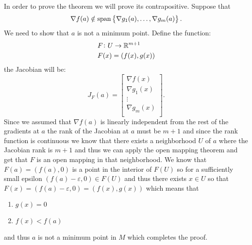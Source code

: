 \documentclass[11pt,a4paper]{article}
\begin{document}
\begin{proofof}{}
  In order to prove the theorem we will prove its contrapositive.
  Suppose that
  \[
    \nabla f(a) \notin 
    \operatorname{span}\left\{\nabla g_1(a),\dots,\nabla g_m(a)\right\}.
  \]
  We need to show that $a$ is not a minimum point.
  Define the function:
  \begin{align*}
    &F \colon U \to \mathbb{R}^{m+1} \\
    &F(x) = (f(x),g(x))
  \end{align*}
  the Jacobian will be:
  \[
  J_F(a) = 
    \begin{bmatrix}
      \nabla f(x)\\
      \nabla g_1(x)\\
      \vdots\\
      \nabla g_m(x)\\
    \end{bmatrix}.
  \]
  Since we assumed that $\nabla f(a)$ is linearly independent from the
  rest of the gradients at $a$ the rank of the Jacobian at $a$ must
  be $m + 1$ and since the rank function is continuous we know that
  there exists a neighborhood $U$ of $a$ where the Jacobian rank is $m + 1$
  and thus we can apply the open mapping theorem and get that $F$
  is an open mapping in that neighborhood. We know that 
  $F(a) = (f(a), 0)$ is a point in the interior of $F(U)$ so for a
  sufficiently small epsilon $(f(a) - \varepsilon, 0) \in F(U)$ and thus
  there exists $x \in U$ so that 
  $F(x) = (f(a) - \varepsilon, 0) = (f(x), g(x))$ which means that
  \begin{enumerate}
    \item[(1)] $g(x) = 0$
    \item[(2)] $f(x) < f(a)$
  \end{enumerate}
  and thus $a$ is not a minimum point in $M$ which completes the proof.
\end{proofof}
\end{document}

